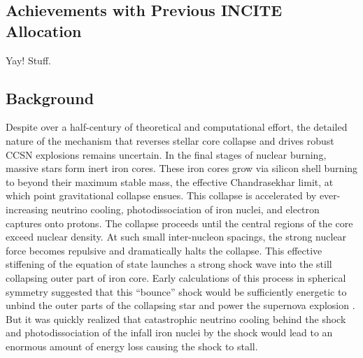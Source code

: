 \subsection{Achievements with Previous INCITE Allocation}
\label{sec:achievements}

Yay! Stuff.

\subsection{Background}

Despite over a half-century of theoretical and computational effort, the detailed nature of the mechanism that reverses stellar core collapse and drives robust CCSN explosions remains uncertain.
In the final stages of nuclear burning, massive stars form inert iron cores.
These iron cores grow via silicon shell burning to beyond their maximum stable mass, the effective Chandrasekhar limit, at which point gravitational collapse ensues.
This collapse is accelerated by ever-increasing neutrino cooling, photodissociation of iron nuclei, and electron captures onto protons.
The collapse proceeds until the central regions of the core exceed nuclear density.
At such small inter-nucleon spacings, the strong nuclear force becomes repulsive and dramatically halts the collapse.
This effective stiffening of the equation of state launches a strong shock wave into the still collapsing outer part of iron core.
Early calculations of this process in spherical symmetry suggested that this ``bounce'' shock would be sufficiently energetic to unbind the outer parts of the collapsing star and power the supernova explosion \citep{Colgate:1961}.
But it was quickly realized that catastrophic neutrino cooling behind the shock and photodissociation of the infall iron nuclei by the shock would lead to an enormous amount of energy loss causing the shock to stall.

